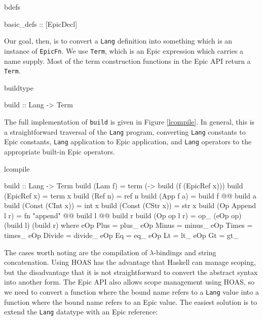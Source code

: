 \begin{SaveVerbatim}{bdefs}

basic_defs :: [EpicDecl]

\end{SaveVerbatim}

\noindent
Our goal, then, is to convert a \texttt{Lang} definition into
something which is an instance of \texttt{EpicFn}. We use
\texttt{Term}, which is an Epic expression which carries a name
supply. Most of the term construction functions in the Epic API return
a \texttt{Term}.

\begin{SaveVerbatim}{buildtype}

build :: Lang -> Term

\end{SaveVerbatim}

\noindent
The full implementation of \texttt{build} is given in Figure \ref{lcompile}.
In general, this is a straightforward traversal of the \texttt{Lang}
program, converting \texttt{Lang} constants to Epic constants,
\texttt{Lang} application to Epic application, and \texttt{Lang}
operators to the appropriate built-in Epic operators. 
                  
\begin{SaveVerbatim}{lcompile}

build :: Lang -> Term
build (Lam f)          = term (\x -> build (f (EpicRef x)))
build (EpicRef x)      = term x
build (Ref n)          = ref n
build (App f a)        = build f @@ build a
build (Const (CInt x)) = int x
build (Const (CStr x)) = str x
build (Op Append l r)  = fn "append" @@ build l @@ build r
build (Op op l r)      = op_ (eOp op) (build l) (build r)
    where eOp Plus   = plus_
          eOp Minus  = minus_
          eOp Times  = times_
          eOp Divide = divide_
          eOp Eq     = eq_
          eOp Lt     = lt_
          eOp Gt     = gt_

\end{SaveVerbatim}

The cases worth noting are the compilation of $\lambda$-bindings and
string concatenation. Using HOAS has the advantage that Haskell can
manage scoping, but the disadvantage that it is not straightforward to
convert the abstract syntax into another form. The Epic API also
allows scope management using HOAS, so we need to convert a function
where the bound name refers to a \texttt{Lang} value into a function
where the bound name refers to an Epic value. The easiest solution is
to extend the \texttt{Lang} datatype with an Epic reference:

